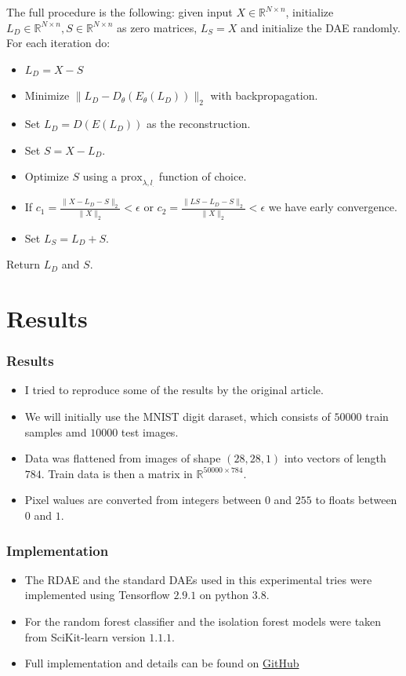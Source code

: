 \documentclass{beamer}
\theoremstyle{plain}
\theoremstyle{definition}
\theoremstyle{remark}
\newcommand{\R}{\mathbb{R}}
\newcommand{\norm}[1]{\lVert#1\rVert}
\newcommand{\prox}{\text{prox}}
\begin{document}
\begin{frame}
	The full procedure is the following: given input $X\in \R^{N\times n}$, initialize $L_D\in \R^{N\times n}, S\in \R^{N\times n}$ as zero matrices, 
	$L_S = X$ and initialize the DAE randomly. For each iteration do:
	\begin{itemize}
		\item $L_D = X - S$
		\item Minimize $\norm{L_D -D_{\theta}(E_{\theta}(L_D))}_2$ with backpropagation.
		\item Set $L_D = D(E(L_D))$ as the reconstruction.
		\item Set $S = X - L_D$.
		\item Optimize $S$ using a $\prox_{\lambda, l_{\cdot}}$ function of choice.
		\item If $c_1 = \frac{\norm{X-L_D-S}_2}{\norm{X}_2} < \epsilon$ or $c_2 = \frac{\norm{LS-L_D-S}_2}{\norm{X}_2} < \epsilon$ we have early convergence.
		\item Set $L_S = L_D + S$.
	\end{itemize}
	Return $L_D$ and $S$.
\end{frame}

\section{Results}

\begin{frame}
	\frametitle{Results}
	\begin{itemize}
		\item I tried to reproduce some of the results by the original article.
		\item We will initially use the MNIST digit daraset, which consists of $50000$ train samples amd $10000$ test images.
		\item Data was flattened from images of shape $(28,28,1)$ into vectors of length $784$. Train data is then a matrix in $\R^{50000\times 784}$.
		\item Pixel walues are converted from integers between $0$ and $255$ to floats between $0$ and $1$.
	\end{itemize}
\end{frame}

\begin{frame}
	\frametitle{Implementation}
	\begin{itemize}
		\item The RDAE and the standard DAEs used in this experimental tries were implemented using Tensorflow $2.9.1$ on python $3.8$.
		\item For the random forest classifier and the isolation forest models were taken from SciKit-learn version $1.1.1$.
		\item Full implementation and details can be found on \hyperref{https://github.com/AlexThirty/SaMLMfTSA}{}{}{GitHub}
	\end{itemize}
\end{frame}
\end{document}
